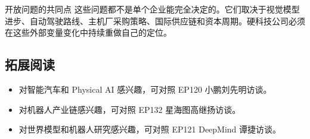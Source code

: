 \documentclass[a4paper]{article}
\begin{document}
\begin{warningbox}{开放问题的共同点}
这些问题都不是单个企业能完全决定的。它们取决于视觉模型进步、自动驾驶路线、主机厂采购策略、国际供应链和资本周期。硬科技公司必须在这些外部变量变化中持续重做自己的定位。
\end{warningbox}

\subsection{拓展阅读}

\begin{itemize}
\item 对智能汽车和 Physical AI 感兴趣，可对照 EP120 小鹏刘先明访谈。
\item 对机器人产业链感兴趣，可对照 EP132 星海图高继扬访谈。
\item 对世界模型和机器人研究感兴趣，可对照 EP121 DeepMind 谭捷访谈。
\end{itemize}
\end{document}
